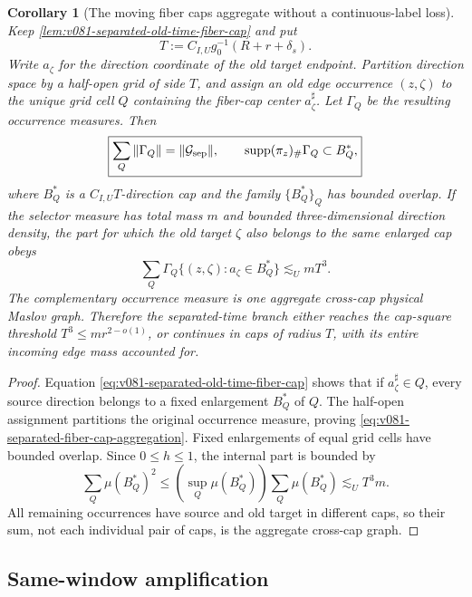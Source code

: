 \documentclass[10pt]{article}
\newtheorem{corollary}[theorem]{Corollary}
\begin{document}
\begin{corollary}[The moving fiber caps aggregate without a continuous-label loss]
\label{cor:v081-separated-fiber-cap-aggregation}
Keep \cref{lem:v081-separated-old-time-fiber-cap} and put
\[
T:=C_{I,U}g_0^{-1}(R+r+\delta_s).
\]
Write \(a_\zeta\) for the direction coordinate of the old target endpoint.
Partition direction space by a half-open grid of side \(T\), and assign an old edge occurrence
\((z,\zeta)\) to the unique grid cell \(Q\) containing the fiber-cap center
\(a_\zeta^\sharp\).  Let \(\Gamma_Q\) be the resulting occurrence measures.  Then
\begin{equation}
\label{eq:v081-separated-fiber-cap-aggregation}
\boxed{
\sum_Q\|\Gamma_Q\|
=
\|\mathcal G_{\rm sep}\|,
\qquad
\operatorname{supp}(\pi_z)_\#\Gamma_Q
\subset B_Q^*,
}
\end{equation}
where \(B_Q^*\) is a \(C_{I,U}T\)-direction cap and the family
\(\{B_Q^*\}_Q\) has bounded overlap.  If the selector measure has total mass \(m\) and bounded
three-dimensional direction density, the part for which the old target \(\zeta\) also belongs to
the same enlarged cap obeys
\begin{equation}
\label{eq:v081-separated-fiber-internal-edge}
\boxed{
\sum_Q
\Gamma_Q\{(z,\zeta):a_\zeta\in B_Q^*\}
\lesssim_U
mT^3.
}
\end{equation}
The complementary occurrence measure is one aggregate cross-cap physical Maslov graph.  Therefore
the separated-time branch either reaches the cap-square threshold \(T^3\le mr^{2-o(1)}\), or
continues in caps of radius \(T\), with its entire incoming edge mass accounted for.
\end{corollary}

\begin{proof}
Equation \eqref{eq:v081-separated-old-time-fiber-cap} shows that if
\(a_\zeta^\sharp\in Q\), every source direction belongs to a fixed enlargement \(B_Q^*\) of \(Q\).
The half-open assignment partitions the original occurrence measure, proving
\eqref{eq:v081-separated-fiber-cap-aggregation}.  Fixed enlargements of equal grid cells have
bounded overlap.  Since \(0\le h\le1\), the internal part is bounded by
\[
\sum_Q\mu(B_Q^*)^2
\le
\left(\sup_Q\mu(B_Q^*)\right)\sum_Q\mu(B_Q^*)
\lesssim_U
T^3m.
\]
All remaining occurrences have source and old target in different caps, so their sum, not each
individual pair of caps, is the aggregate cross-cap graph.
\end{proof}

\subsection{Same-window amplification}
\end{document}
